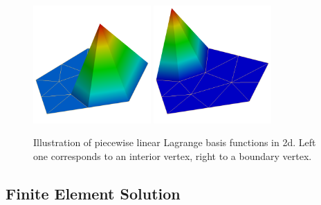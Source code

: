 \documentclass[a4paper,
		     11pt,
		     DIV12,
		     DIVcalc,
		     headings=normal,
		     oneside,
		     bibliography=totoc,
		     headsepline=false,
		     headinclude]{scrartcl}
\begin{document}
\begin{figure}
\begin{center}
\includegraphics[width=0.4\textwidth]{p1_1}\hspace{0.1\textwidth}
\includegraphics[width=0.4\textwidth]{p1_2}
\end{center}
\caption{Illustration of piecewise linear Lagrange basis functions in 2d. Left one 
corresponds to an interior vertex, right to a boundary vertex.}
\label{fig:p1basis}
\end{figure}

\subsection{Finite Element Solution}
\end{document}
